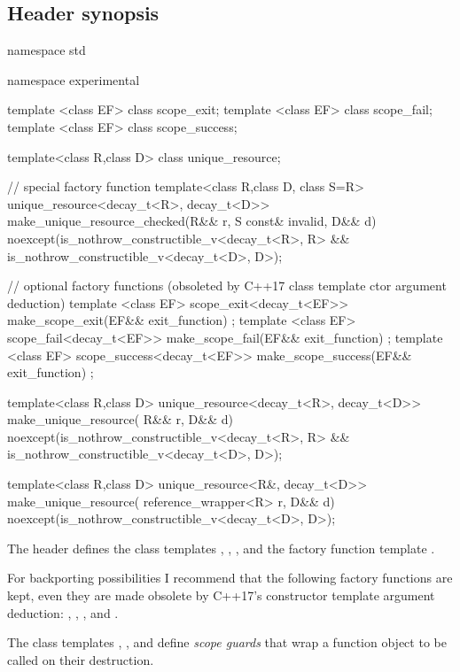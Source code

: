 \documentclass[ebook,11pt,article]{memoir}
\begin{document}
\subsection{Header  synopsis}


\begin{codeblock}
namespace std {
namespace experimental {
template <class EF>
class scope_exit;
template <class EF>
class scope_fail;
template <class EF>
class scope_success;


template<class R,class D>
class unique_resource;

// special factory function
template<class R,class D, class S=R>
unique_resource<decay_t<R>, decay_t<D>>
make_unique_resource_checked(R&& r, S const& invalid, D&& d)
noexcept(is_nothrow_constructible_v<decay_t<R>, R> &&
         is_nothrow_constructible_v<decay_t<D>, D>);

// optional factory functions (obsoleted by C++17 class template ctor argument deduction)
template <class EF>
scope_exit<decay_t<EF>> make_scope_exit(EF&& exit_function) ;
template <class EF>
scope_fail<decay_t<EF>> make_scope_fail(EF&& exit_function) ;
template <class EF>
scope_success<decay_t<EF>> make_scope_success(EF&& exit_function) ;

template<class R,class D>
unique_resource<decay_t<R>, decay_t<D>>
make_unique_resource( R&&  r, D&& d) 
noexcept(is_nothrow_constructible_v<decay_t<R>, R> &&
         is_nothrow_constructible_v<decay_t<D>, D>);

template<class R,class D>
unique_resource<R&, decay_t<D>>
make_unique_resource( reference_wrapper<R>  r, D&& d) 
noexcept(is_nothrow_constructible_v<decay_t<D>, D>);

}}
\end{codeblock}

\pnum
The header   defines the class templates , , ,  and
the factory function template .
\begin{note}
For backporting possibilities I recommend that the following factory functions are kept, even they are made obsolete by C++17's constructor template argument deduction:
, , , and
.
\end{note}

\pnum 
The class templates , , and  define\emph{ scope guards} that wrap a function object to be called on their destruction.
\end{document}
